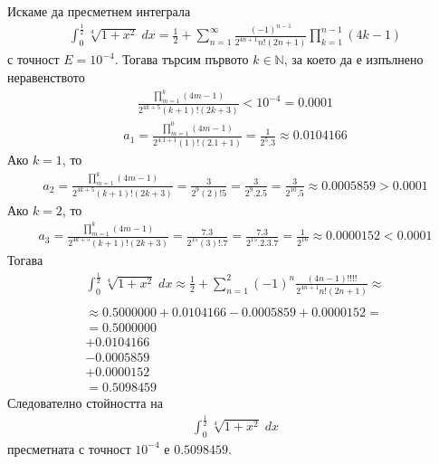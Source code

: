 \documentclass[a4paper,14pt]{extarticle}
\newcommand{\N}{\mathbb{N}}
\begin{document}
Искаме да пресметнем интеграла \begin{align*}
    \displaystyle\int_0^{\frac{1}{2}} \sqrt[4]{1 + x^2} \; dx = \frac{1}{2} + \displaystyle\sum_{n = 1}^{\infty} \frac{(-1)^{n - 1}}{2^{4n + 1} n! (2n + 1)}\displaystyle\prod_{k = 1}^{n - 1}(4k - 1)
\end{align*} с точност $E = 10^{-4}$. Тогава търсим първото $k \in \N$,
за което да е изпълнено неравенството
\begin{align*}
    \displaystyle\frac{\displaystyle\prod_{m = 1}^{k}(4m - 1)}{2^{4k + 5}(k + 1)!(2k + 3)} < 10^{-4} = 0.0001
\end{align*}
\begin{align*}
    a_1 = \displaystyle\frac{\displaystyle\prod_{m = 1}^{0}(4m - 1)}{2^{4.1 + 1}(1)!(2.1 + 1)} = \frac{1}{2^{5}.3} \approx 0.0104166 
\end{align*}
Ако $k = 1$, то \begin{align*}
    a_2 = \displaystyle\frac{\displaystyle\prod_{m = 1}^{k}(4m - 1)}{2^{4k + 5}(k + 1)!(2k + 3)} = \frac{3}{2^{9}(2)!5} = \frac{3}{2^{9}.2.5} = \frac{3}{2^{10}.5} \approx 0.0005859 > 0.0001 
\end{align*}
Ако $k = 2$, то \begin{align*}
    a_3 = \displaystyle\frac{\displaystyle\prod_{m = 1}^{k}(4m - 1)}{2^{4k + 5}(k + 1)!(2k + 3)} = \frac{7.3}{2^{15}(3)!.7} = \frac{7.3}{2^{15}.2.3.7} = \frac{1}{2^{16}} \approx 0.0000152 < 0.0001 
\end{align*}
Тогава \begin{align*}
    \displaystyle\int_0^{\frac{1}{2}} \sqrt[4]{1 + x^2} \; dx \approx \frac{1}{2} + \displaystyle\sum_{n = 1}^{2} (-1)^{n}\frac{(4n - 1)!!!!}{2^{4n + 1}n!(2n + 1)} \approx \\\\
    \approx 0.5000000 + 0.0104166 - 0.0005859 + 0.0000152 = \\
    = 0.5000000 \\
    + 0.0104166 \\
    - 0.0005859 \\
    + 0.0000152 \\
    = 0.5098459
\end{align*}
Следователно стойността на \begin{align*}
    \displaystyle\int_0^{\frac{1}{2}} \sqrt[4]{1 + x^2} \; dx
\end{align*} пресметната с точност $10^{-4}$ е $0.5098459$.
\end{document}
